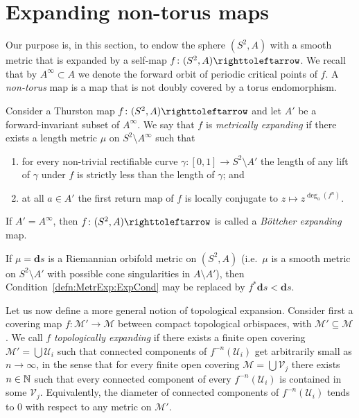 \documentclass{amsart}
\newcommand\dd{\mathbf{d}}
\begin{document}
\section{Expanding non-torus maps}
Our purpose is, in this section, to endow the sphere $(S^2,A)$ with a
smooth metric that is expanded by a self-map
$f\colon (S^2,A)\selfmap$. We recall that by $A^\infty\subset A$ we
denote the forward orbit of periodic critical points of $f$.  A
\emph{non-torus} map is a map that is not doubly covered by a torus
endomorphism.

\begin{defn}
  Consider a Thurston map $f\colon (S^2,A)\selfmap$ and let $A'$ be
  a forward-invariant subset of $A^\infty$. We say that $f$ is
  \emph{metrically expanding} if there exists a length metric $\mu$ on
  $S^2\setminus A^\infty$ such that
 \begin{enumerate}
 \item for every non-trivial rectifiable curve
   $\gamma\colon[0,1]\to S^2\setminus A'$ the length of any lift of
   $ \gamma$ under $f$ is strictly less than the length of $\gamma$;
   and \label{defn:MetrExp:ExpCond}
 \item at all $a\in A'$ the first return map of $f$ is locally
   conjugate to $z\mapsto z^{\deg_a(f ^n)}$.\label{defn:MetrExp:NormCond}
 \end{enumerate}
  
 If $A'=A^\infty$, then $f\colon (S^2,A)\selfmap$ is called a
 \emph{B\"ottcher expanding} map.
\end{defn}

If $\mu=\dd s$ is a Riemannian orbifold metric on $(S^2,A)$
(i.e.~$\mu$ is a smooth metric on $S^2\setminus A'$ with possible cone
singularities in $A\setminus A'$), then
Condition~\eqref{defn:MetrExp:ExpCond} may be replaced by
$f^*\dd s<\dd s$.

Let us now define a more general notion of topological
expansion. Consider first a covering map
$f\colon \mathcal M'\to \mathcal M$ between compact topological
orbispaces, with $\mathcal M'\subseteq \mathcal M$. We call $f$
\emph{topologically expanding} if there exists a finite open covering
$\mathcal M'=\bigcup\mathcal U_i$ such that connected components of
$f^{-n}(\mathcal U_i)$ get arbitrarily small as $n\to\infty$, in the
sense that for every finite open covering
$\mathcal M=\bigcup\mathcal V_j$ there exists $n\in{\mathbb N}$ such that every
connected component of every $f^{-n}(\mathcal U_i)$ is contained in
some $\mathcal V_j$. Equivalently, the diameter of connected
components of $f^{-n}(\mathcal U_i)$ tends to $0$ with respect to any
metric on $\mathcal M'$.
\end{document}
